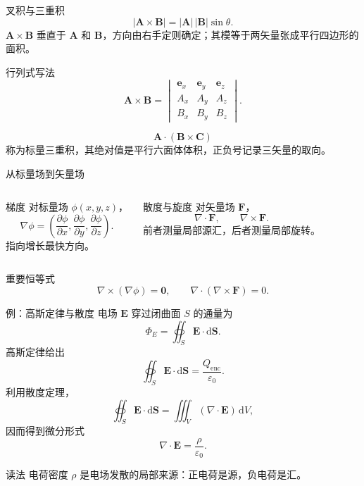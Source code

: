 \begin{frame}{叉积与三重积}
  \[
    |\mathbf{A}\times\mathbf{B}|=|\mathbf{A}|\,|\mathbf{B}|\sin\theta.
  \]
  $\mathbf{A}\times\mathbf{B}$ 垂直于 $\mathbf{A}$ 和 $\mathbf{B}$，方向由右手定则确定；其模等于两矢量张成平行四边形的面积。
  \begin{block}{行列式写法}
    \[
      \mathbf{A}\times\mathbf{B}=
      \begin{vmatrix}
        \mathbf{e}_x&\mathbf{e}_y&\mathbf{e}_z\\
        A_x&A_y&A_z\\
        B_x&B_y&B_z
      \end{vmatrix}.
    \]
  \end{block}
  \[
    \mathbf{A}\cdot(\mathbf{B}\times\mathbf{C})
  \]
  称为标量三重积，其绝对值是平行六面体体积，正负号记录三矢量的取向。
\end{frame}

\begin{frame}{从标量场到矢量场}
  \begin{columns}[T]
    \begin{block}{梯度}
      对标量场 $\phi(x,y,z)$，
      \[
        \nabla\phi=\left(\frac{\partial\phi}{\partial x},
        \frac{\partial\phi}{\partial y},
        \frac{\partial\phi}{\partial z}\right).
      \]
      指向增长最快方向。
    \end{block}
    \begin{block}{散度与旋度}
      对矢量场 $\mathbf{F}$，
      \[
        \nabla\cdot\mathbf{F},\qquad \nabla\times\mathbf{F}.
      \]
      前者测量局部源汇，后者测量局部旋转。
    \end{block}
  \end{columns}
  \begin{alertblock}{重要恒等式}
    \[
      \nabla\times(\nabla\phi)=\mathbf{0},
      \qquad
      \nabla\cdot(\nabla\times\mathbf{F})=0.
    \]
  \end{alertblock}
\end{frame}

\begin{frame}{例：高斯定律与散度}
  电场 $\mathbf{E}$ 穿过闭曲面 $S$ 的通量为
  \[
    \Phi_E=\oiint_S\mathbf{E}\cdot\mathrm{d}\mathbf{S}.
  \]
  高斯定律给出
  \[
    \oiint_S\mathbf{E}\cdot\mathrm{d}\mathbf{S}=\frac{Q_{\mathrm{enc}}}{\varepsilon_0}.
  \]
  利用散度定理，
  \[
    \oiint_S\mathbf{E}\cdot\mathrm{d}\mathbf{S}
    =\iiint_V(\nabla\cdot\mathbf{E})\,\mathrm{d}V,
  \]
  因而得到微分形式
  \[
    \nabla\cdot\mathbf{E}=\frac{\rho}{\varepsilon_0}.
  \]
  \begin{block}{读法}
    电荷密度 $\rho$ 是电场发散的局部来源：正电荷是源，负电荷是汇。
  \end{block}
\end{frame}
